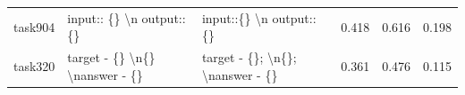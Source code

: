 \begin{table}[]
\begin{tabular}{@{}cp{4.2cm\ttfamily\tiny}p{4.2cm\ttfamily\tiny}ccc@{}}
task904    & input:: \{\} \textbackslash{}n output:: \{\}                                                                                                                                & input::\{\} \textbackslash{}n output::\{\}                                                                                                                                            & 0.418  & 0.616  & 0.198     \\
task320    & target - \{\} \textbackslash{}n\{\} \textbackslash{}nanswer - \{\}                                                                                                          & target - \{\}; \textbackslash{}n\{\}; \textbackslash{}nanswer - \{\}                                                                                                                  & 0.361  & 0.476  & 0.115     \\

\end{tabular}
\end{table}

